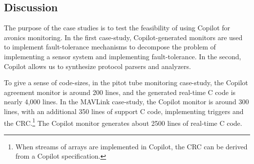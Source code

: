 \subsection{Discussion}
The purpose of the case studies is to test the feasibility of using Copilot for
avonics monitoring.  In the first case-study, Copilot-generated monitors are
used to implement fault-tolerance mechanisms to decompose the problem of
implementing a sensor system and implementing fault-tolerance.  In the second,
Copilot allows us to synthesize protocol parsers and analyzers.

To give a sense of code-sizes, in the pitot tube monitoring case-study, the
Copilot agreement monitor is around 200 lines, and the generated real-time C
code is nearly 4,000 lines.  In the MAVLink case-study, the Copilot monitor is
around 300 lines, with an additional 350 lines of support C code, implementing
triggers and the CRC.\footnote{When streams of arrays are implemented in
  Copilot, the CRC can be derived from a Copilot specification.}  The Copilot
monitor generates about 2500 lines of real-time C code.





